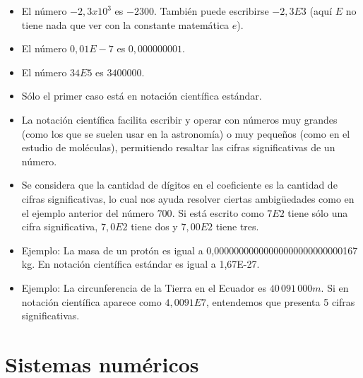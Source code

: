 \documentclass[]{book}
\begin{document}
\begin{itemize}
\item
  El número \(-2,3 x 10^3\) es \(-2300\). También puede escribirse \(-2,3E3\) (aquí \(E\) no tiene nada que ver con la constante matemática \(e\)).
\item
  El número \(0,01E-7\) es \(0,000000001\).
\item
  El número \(34E5\) es \(3400000\).
\item
  Sólo el primer caso está en notación científica estándar.
\item
  La notación científica facilita escribir y operar con números muy grandes (como los que se suelen usar en la astronomía) o muy pequeños (como en el estudio de moléculas), permitiendo resaltar las cifras significativas de un número.
\item
  Se considera que la cantidad de dígitos en el coeficiente es la cantidad de cifras significativas, lo cual nos ayuda resolver ciertas ambigüedades como en el ejemplo anterior del número \(700\). Si está escrito como \(7E2\) tiene sólo una cifra significativa, \(7,0E2\) tiene dos y \(7,00E2\) tiene tres.
\item
  Ejemplo: La masa de un protón es igual a 0,00000000000000000000000000167 kg. En notación científica estándar es igual a 1,67E-27.
\item
  Ejemplo: La circunferencia de la Tierra en el Ecuador es \(40 \, 091 \, 000 m\). Si en notación científica aparece como \(4,0091E7\), entendemos que presenta 5 cifras significativas.
\end{itemize}

\hypertarget{sistemas-numuxe9ricos}{%
\section{Sistemas numéricos}\label{sistemas-numuxe9ricos}}
\end{document}

